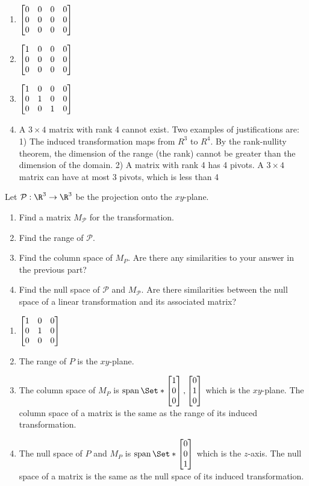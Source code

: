 \begin{exercises}
\begin{problist}
		\begin{solution}
			\begin{enumerate}
				\item $\mat{0&0&0&0\\0&0&0&0\\0&0&0&0}$

				\item $\mat{1&0&0&0\\0&0&0&0\\0&0&0&0}$

				\item $\mat{1&0&0&0\\0&1&0&0\\0&0&1&0}$

				\item A $3\times4$ matrix with rank 4 cannot exist. Two examples of justifications
					are: 1) The induced transformation maps from $R^{3}$ to $R^{4}$. By
					the rank-nullity theorem, the dimension of the range (the rank) cannot
					be greater than the dimension of the domain. 2) A matrix with rank 4
					has 4 pivots. A $3\times4$ matrix can have at most 3 pivots, which is
					less than 4
			\end{enumerate}
		\end{solution}

		\prob Let $\mathcal{P}:\R^3\to\R^3$ be the projection onto the $xy$-plane.
		\begin{enumerate}
			\item Find a matrix $M_\mathcal{P}$ for the transformation.
			\item Find the range of $\mathcal{P}$.
			\item Find the column space of $M_P$. Are there any similarities to your answer in the previous part?
			\item Find the null space of $\mathcal{P}$ and $M_\mathcal{P}$. Are there similarities between the null space of a linear transformation and its associated matrix?
		\end{enumerate}

		\begin{solution}
			\begin{enumerate}
				\item $\mat{1&0&0\\0&1&0\\0&0&0}$
				\item The range of $P$ is the $xy$-plane.
				\item The column space of $M_P$ is $\Span\Set*{\mat{1\\0\\0},\mat{0\\1\\0}}$ which is the $xy$-plane. The column space of a matrix is the same as the range of its induced transformation.
				\item The null space of $P$ and $M_P$ is $\Span\Set*{\mat{0\\0\\1}}$ which is the $z$-axis. The null space of a matrix is the same as the null space of its induced transformation.
			\end{enumerate}
		\end{solution}


\end{problist}
\end{exercises}
